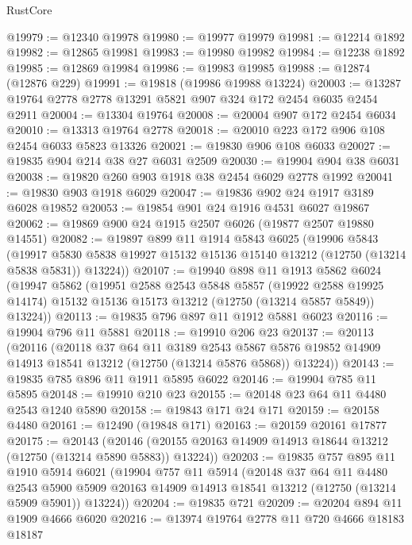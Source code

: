 \begin{lexlean}{RustCore}
\begin{coremodule}
@19979 := @12340 @19978
@19980 := @19977 @19979
@19981 := @12214 @1892
@19982 := @12865 @19981
@19983 := @19980 @19982
@19984 := @12238 @1892
@19985 := @12869 @19984
@19986 := @19983 @19985
@19988 := @12874 (@12876 @229)
@19991 := @19818 (@19986 @19988 @13224)
@20003 := @13287 @19764 @2778 @2778 @13291 @5821 @907 @324 @172 @2454 @6035 @2454 @2911
@20004 := @13304 @19764
@20008 := @20004 @907 @172 @2454 @6034
@20010 := @13313 @19764 @2778
@20018 := @20010 @223 @172 @906 @108 @2454 @6033 @5823 @13326
@20021 := @19830 @906 @108 @6033
@20027 := @19835 @904 @214 @38 @27 @6031 @2509
@20030 := @19904 @904 @38 @6031
@20038 := @19820 @260 @903 @1918 @38 @2454 @6029 @2778 @1992
@20041 := @19830 @903 @1918 @6029
@20047 := @19836 @902 @24 @1917 @3189 @6028 @19852
@20053 := @19854 @901 @24 @1916 @4531 @6027 @19867
@20062 := @19869 @900 @24 @1915 @2507 @6026 (@19877 @2507 @19880 @14551)
@20082 := @19897
    @899
    @11
    @1914
    @5843
    @6025
    (@19906
      @5843
      (@19917 @5830 @5838 @19927 @15132 @15136 @15140 @13212 (@12750 (@13214 @5838 @5831)) @13224))
@20107 := @19940
    @898
    @11
    @1913
    @5862
    @6024
    (@19947
      @5862
      (@19951
        @2588
        @2543
        @5848
        @5857
        (@19922 @2588 @19925 @14174)
        @15132
        @15136
        @15173
        @13212
        (@12750 (@13214 @5857 @5849))
        @13224))
@20113 := @19835 @796 @897 @11 @1912 @5881 @6023
@20116 := @19904 @796 @11 @5881
@20118 := @19910 @206 @23
@20137 := @20113
    (@20116
      (@20118
        @37
        @64
        @11
        @3189
        @2543
        @5867
        @5876
        @19852
        @14909
        @14913
        @18541
        @13212
        (@12750 (@13214 @5876 @5868))
        @13224))
@20143 := @19835 @785 @896 @11 @1911 @5895 @6022
@20146 := @19904 @785 @11 @5895
@20148 := @19910 @210 @23
@20155 := @20148 @23 @64 @11 @4480 @2543 @1240 @5890
@20158 := @19843 @171 @24 @171
@20159 := @20158 @4480
@20161 := @12490 (@19848 @171)
@20163 := @20159 @20161 @17877
@20175 := @20143
    (@20146 (@20155 @20163 @14909 @14913 @18644 @13212 (@12750 (@13214 @5890 @5883)) @13224))
@20203 := @19835
    @757
    @895
    @11
    @1910
    @5914
    @6021
    (@19904
      @757
      @11
      @5914
      (@20148
        @37
        @64
        @11
        @4480
        @2543
        @5900
        @5909
        @20163
        @14909
        @14913
        @18541
        @13212
        (@12750 (@13214 @5909 @5901))
        @13224))
@20204 := @19835 @721
@20209 := @20204 @894 @11 @1909 @4666 @6020
@20216 := @13974 @19764 @2778 @11 @720 @4666 @18183 @18187

\end{coremodule}
\end{lexlean}
